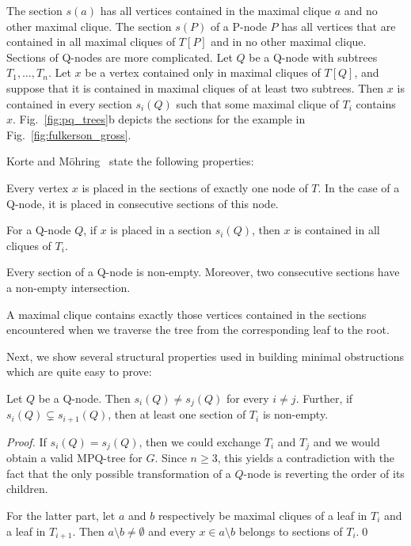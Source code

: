 The section $s(a)$ has all vertices contained in the maximal clique $a$ and no other maximal clique.
The section $s(P)$ of a P-node $P$ has all vertices that are contained in all maximal cliques of
$T[P]$ and in no other maximal clique. Sections of Q-nodes are more complicated.
Let $Q$ be a Q-node with subtrees $T_1,\dots,T_n$. Let $x$ be a vertex contained only in maximal
cliques of $T[Q]$, and suppose that it is contained in maximal cliques of at
least two subtrees. Then $x$ is contained in every section $s_i(Q)$ such that some maximal clique of
$T_i$ contains $x$. Fig.~\ref{fig:pq_trees}b depicts the sections for the example in
Fig.~\ref{fig:fulkerson_gross}.

Korte and M\"ohring~\cite{korte_mohring} state the following properties:
\begin{packed_itemize}
\item Every vertex $x$ is placed in the sections of exactly one node of $T$. In the case of a
Q-node, it is placed in consecutive sections of this node.
\item For a Q-node $Q$, if $x$ is placed in a section $s_i(Q)$, then $x$ is contained in all cliques
of $T_i$.
\item Every section of a Q-node is non-empty. Moreover, two consecutive sections have a non-empty
intersection.
\item A maximal clique contains exactly those vertices contained in the sections encountered when we traverse the
tree from the corresponding leaf to the root.
\end{packed_itemize}

 Next, we show several structural properties used in
building minimal obstructions which are quite easy to prove:

\begin{lemma} \label{lem:different_sections}
Let $Q$ be a Q-node. Then $s_i(Q) \ne s_j(Q)$ for every $i \ne j$. Further, if $s_i(Q) \subsetneq
s_{i+1}(Q)$, then at least one section of $T_i$ is non-empty. 
\end{lemma}

\begin{proof}
If $s_i(Q) = s_j(Q)$, then we could exchange $T_i$ and $T_j$ and we would obtain a valid MPQ-tree
for $G$. Since $n \ge 3$, this yields a contradiction with the fact that the only possible
transformation of a $Q$-node is reverting the order of its children.

For the latter part, let $a$ and $b$ respectively be maximal cliques of a leaf in $T_i$ and a leaf in $T_{i+1}$. Then $a \setminus b \neq \emptyset$ and
every $x \in a \setminus b$ belongs to sections of $T_i$.\qed
\end{proof}


